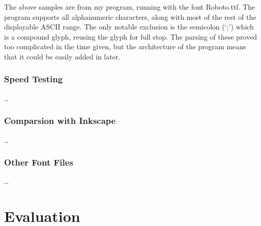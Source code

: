 \documentclass{report}
\begin{document}
The above samples are from my program, running with the font Roboto.ttf. The
program supports all alphanumeric characters, along with most of the rest of the
displayable ASCII range. The only notable exclusion is the semicolon (`;') which
is a compound glyph, reusing the glyph for full stop. The parsing of these
proved too complicated in the time given, but the architecture of the program
means that it could be easily added in later.

\subsection{Speed Testing}
\dots
\subsection{Comparsion with Inkscape}
\dots
\subsection{Other Font Files}
\dots
\chapter{Evaluation}
\end{document}
